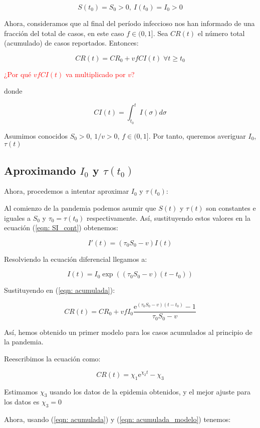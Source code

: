 $$S(t_0)=S_0>0, \: I(t_0)=I_0>0$$

Ahora, consideramos que al final del período infeccioso nos han informado de una fracción del total de casos, en este caso $f\in (0,1]$. Sea $CR(t)$ el número total (acumulado) de casos reportados. Entonces:

\begin{equation}
\label{eqn: acumulada}
CR(t) = CR_0 + vfCI(t) \; \forall t \geq t_0
\end{equation}

\textcolor{red}{¿Por qué $vfCI(t)$ va multiplicado por $v$?}

donde

$$CI(t) = \int_{t_0}^t I(\sigma ) d\sigma $$

Asumimos conocidos $S_0 > 0$, $1/v>0$, $f\in (0,1]$. Por tanto, queremos averiguar $I_0$, $\tau (t)$

\subsection{Aproximando $I_0$ y $\tau (t_0)$}
Ahora, procedemos a intentar aproximar $I_0$ y $\tau (t_0)$:

Al comienzo de la pandemia podemos asumir que $S(t)$ y $\tau (t)$ son constantes e iguales a $S_0$ y $\tau_0 = \tau (t_0)$ respectivamente. Así, sustituyendo estos valores en la ecuación (\ref{eqn: SI_cont}) obtenemos:

$$I'(t) = (\tau_0 S_0 -v) I(t)$$

Resolviendo la ecuación diferencial llegamos a:

$$I(t) = I_0\exp{((\tau_0 S_0-v)(t-t_0))}$$

Sustituyendo en (\ref{eqn: acumulada}):

$$CR(t) = CR_0 + vfI_0\frac{\mathrm{e}^{(\tau_0 S_0 -v)(t-t_0)} -1}{\tau_0 S_0-v}$$

Así, hemos obtenido un primer modelo para los casos acumulados al principio de la pandemia.

Reescribimos la ecuación como:

\begin{equation}
\label{eqn: acumulada_modelo}
CR(t) = \chi_1 \mathrm{e}^{\chi_2 t} -\chi_3
\end{equation}

Estimamos $\chi_3$ usando los datos de la epidemia obtenidos, y el mejor ajuste para los datos es $\chi_3=0$

Ahora, usando (\ref{eqn: acumulada}) y (\ref{eqn: acumulada_modelo}) tenemos:

